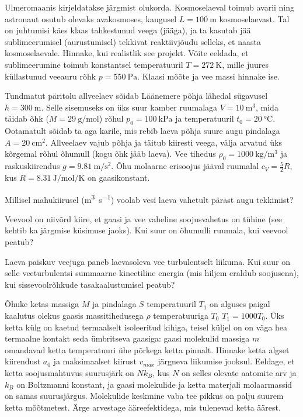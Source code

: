\documentclass[a4paper,11pt,twocolumn]{article}
\begin{document}
\begin{question}
	Ulmeromaanis kirjeldatakse järgmist olukorda. Kosmoselaeval toimub avarii ning astronaut osutub olevaks avakosmoses, kaugusel \( L = \SI{100}{\m} \) kosmoselaevast. Tal on juhtumisi käes klaas tahkestunud veega (jääga), ja ta kasutab jää sublimeerumisel (aurustumisel) tekkivat reaktiivjõudu selleks, et naasta kosmoselaevale. Hinnake, kui realistlik see projekt. Võite eeldada, et sublimeerumine toimub konstantsel temperatuuril \( T = \SI{272}{\K} \), mille juures küllastunud veeauru rõhk \( p = \SI{550}{\Pa} \). Klaasi mõõte ja vee massi hinnake ise.
\end{question}
\begin{question}[NBPhO 2018, P8]
Tundmatut päritolu allveelaev sõidab Läänemere põhja lähedal sügavusel \( h = \SI{300}{\m} \). Selle sisemuseks on üks suur kamber ruumalaga \( V = \SI{10}{\m\tothe{3}} \), mida täidab õhk (\( M = \SI{29}{\g\per\mol} \)) rõhul \( p_0 = \SI{100}{\kPa} \) ja temperatuuril \( t_0 = \SI{20}{\degreeCelsius} \). Ootamatult sõidab ta aga karile, mis rebib laeva põhja suure augu pindalaga \( A = \SI{20}{\cm\squared}\). Allveelaev vajub põhja ja täitub kiiresti veega, välja arvatud üks kõrgemal rõhul õhumull (kogu õhk jääb laeva). Vee tihedus \( \rho_0 = \SI{1000}{\kg\per\m\cubed} \) ja raskuskiirendus \( g =\SI{9,81}{\m\per\s\squared} \). Õhu molaarne erisoojus jääval ruumalal \( c_V =\frac{5}{2}R \), kus \( R = \SI{8,31}{\J\per\mol\per\K}  \) on gaasikonstant.
\begin{subquestion}
	\item Millisel mahukiirusel (\si{\m\cubed\per\s}) voolab vesi laeva vahetult pärast augu tekkimist?
	\item Veevool on niivõrd kiire, et gaasi ja vee vaheline soojusvahetus on tühine (see kehtib ka järgmise küsimuse jaoks). Kui suur on õhumulli ruumala, kui veevool peatub?
	\item Laeva paiskuv veejuga paneb laevasoleva vee turbulentselt liikuma. Kui suur on selle veeturbulentsi summaarne kineetiline energia (mis hiljem eraldub soojusena), kui sissevoolrõhkude tasakaalustumisel peatub?
\end{subquestion}
\end{question}
\begin{question}[EuPhO 2017, T2]
	Õhuke ketas massiga \( M \) ja pindalaga \( S \) temperatuuril \( T_1 \) on alguses paigal kaalutus olekus gaasis massitihedusega \( \rho \) temperatuuriga \( T_0 \) \(T_1=1000T_0\). Üks ketta külg on kaetud termaalselt isoleeritud kihiga, teisel küljel on on väga hea termaalne kontakt seda ümbritseva gaasiga: gaasi molekulid massiga \( m \) omandavad ketta temperatuuri ühe põrkega ketta pinnalt. Hinnake ketta algset kiirendust \( a_0 \) ja maksimaalset kiirust \( v_{max} \) järgneva liikumise jooksul. Eeldage, et ketta soojusmahtuvus suurusjärk on \( Nk_B \), kus \( N \) on selles olevate aatomite arv ja \( k_B \) on Boltzmanni konstant, ja gaasi molekulide ja ketta materjali molaarmassid on samas suurusjärgus. Molekulide keskmine vaba tee pikkus on palju suurem ketta mõõtmetest. Ärge arvestage ääreefektidega, mis tulenevad ketta äärest.
\end{question}
\end{document}
